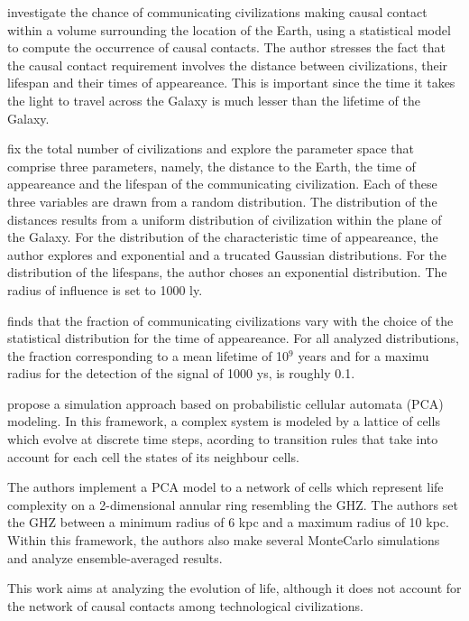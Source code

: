 \documentclass[crop]{CSLB}%
\begin{document}
\citet{balbi_impact_2018} investigate the chance of communicating
civilizations making causal contact within a volume surrounding the
location of the Earth, using a statistical model to compute the
occurrence of causal contacts. The author stresses the fact that the
causal contact requirement involves the distance between
civilizations, their lifespan and their times of appeareance.  This is
important since the time it takes the light to travel across the
Galaxy is much lesser than the lifetime of the Galaxy.

\citet{balbi_impact_2018} fix the total number of civilizations and
explore the parameter space that comprise three parameters, namely,
the distance to the Earth, the time of appeareance and the lifespan of
the communicating civilization. Each of these three variables are
drawn from a random distribution. The distribution of the distances
results from a uniform distribution of civilization within the plane
of the Galaxy. For the distribution of the characteristic time of
appeareance, the author explores and exponential and a trucated
Gaussian distributions. For the distribution of the lifespans, the
author choses an exponential distribution. The radius of influence is
set to 1000 ly.

\citet{balbi_impact_2018} finds that the fraction of communicating
civilizations vary with the choice of the statistical distribution for
the time of appeareance. For all analyzed distributions, the fraction
corresponding to a mean lifetime of 10$^9$ years and for a maximu
radius for the detection of the signal of 1000 ys, is roughly 0.1.

\citet{vukotic_astrobiological_2012} propose a simulation approach
based on probabilistic cellular automata (PCA) modeling. In this
framework, a complex system is modeled by a lattice of cells which
evolve at discrete time steps, acording to transition rules that take
into account for each cell the states of its neighbour cells.

The authors implement a PCA model to a network of cells which
represent life complexity on a 2-dimensional annular ring resembling
the GHZ. The authors set the GHZ between a minimum radius of 6 kpc and
a maximum radius of 10 kpc. Within this framework, the authors also
make several MonteCarlo simulations and analyze ensemble-averaged
results.

This work aims at analyzing the evolution of life, although it does
not account for the network of causal contacts among technological
civilizations.
\end{document}
